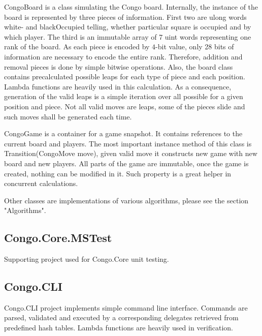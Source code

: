 \textsf{CongoBoard} is a class simulating the Congo board. Internally, the
instance of the board is represented by three pieces of information. First two
are \textsf{ulong} words \textsf{white-} and \textsf{blackOccupied} telling,
whether particular square is occupied and by which player. The third is an
immutable array of 7 \textsf{uint} words representing one rank of the board.
As each piece is encoded by $4$-bit value, only 28 bits of information are
necessary to encode the entire rank. Therefore, addition and removal pieces is
done by simple bitwise operations. Also, the board class contains precalculated
possible leaps for each type of piece and each position. Lambda functions are
heavily used in this calculation. As a consequence, generation of the valid
leaps is a simple iteration over all possible for a given position and piece.
Not all valid moves are leaps, some of the pieces slide and such moves shall
be generated each time.

\vspace{0.5em}

\textsf{CongoGame} is a container for a game snapshot. It contains references
to the current board and players. The most important instance method of this
class is \textsf{Transition(CongoMove move)}, given valid move it constructs
new game with new board and new players. All parts of the game are immutable,
once the game is created, nothing can be modified in it. Such property is a
great helper in concurrent calculations.

\vspace{0.5em}

Other classes are implementations of various algorithms, please see the
section "Algorithms".

\subsection{Congo.Core.MSTest}

Supporting project used for \textsf{Congo.Core} unit testing.

\subsection{Congo.CLI}

\textsf{Congo.CLI} project implements simple command line interface. Commands
are parsed, validated and executed by a corresponding delegates retrieved from 
predefined hash tables. Lambda functions are heavily used in verification.

